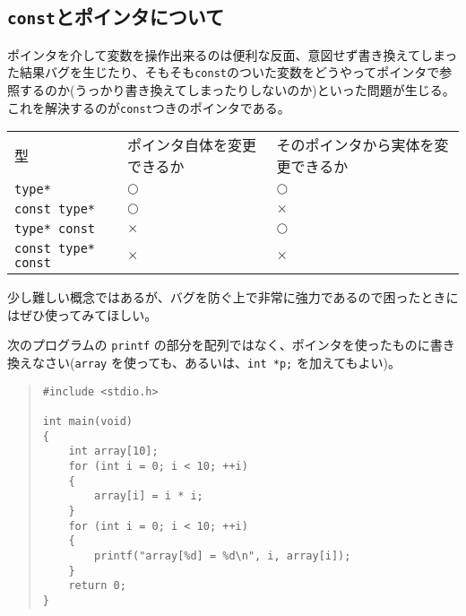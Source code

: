 \subsection{\texttt{const}とポインタについて}
ポインタを介して変数を操作出来るのは便利な反面、意図せず書き換えてしまった結果バグを生じたり、そもそも\texttt{const}のついた変数をどうやってポインタで参照するのか(うっかり書き換えてしまったりしないのか)といった問題が生じる。これを解決するのが\texttt{const}つきのポインタである。

\begin{table}[H]
    \centering
    \begin{tabular}{lll}
        型                         & ポインタ自体を変更できるか & そのポインタから実体を変更できるか \\
        \texttt{type*}             & \(\bigcirc\)               & \(\bigcirc\)                       \\
        \texttt{const type*}       & \(\bigcirc\)               & \(\times\)                         \\
        \texttt{type* const}       & \(\times\)                 & \(\bigcirc\)                       \\
        \texttt{const type* const} & \(\times\)                 & \(\times\)
    \end{tabular}
\end{table} \noindent

少し難しい概念ではあるが、バグを防ぐ上で非常に強力であるので困ったときにはぜひ使ってみてほしい。
\begin{renshuu}\label{prob:5-1}
    次のプログラムの \texttt{printf} の部分を配列ではなく、ポインタを使ったものに書き換えなさい(\texttt{array} を使っても、あるいは、\texttt{int *p;} を加えてもよい)。
\begin{quote}
\begin{verbatim}
#include <stdio.h>

int main(void)
{
    int array[10];
    for (int i = 0; i < 10; ++i)
    {
        array[i] = i * i;
    }
    for (int i = 0; i < 10; ++i)
    {
        printf("array[%d] = %d\n", i, array[i]);
    }
    return 0;
}
\end{verbatim}
\end{quote}
\end{renshuu}

